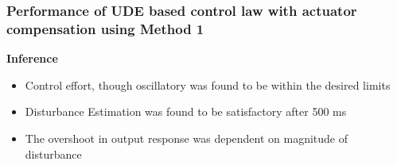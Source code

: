 \documentclass[table,10pt,red]{beamer}	%
\begin{document}
\begin{frame}
\frametitle{Performance of UDE based control law with actuator compensation using Method 1}
\textbf{Inference}
\begin{itemize}  %
		\item Control effort, though oscillatory was found to be within the desired limits
		\item Disturbance Estimation was found to be satisfactory after 500 ms
		\item The overshoot in output response was dependent on magnitude of disturbance

\end{itemize}
\end{frame}
\end{document}
